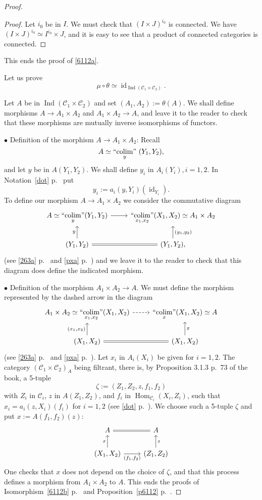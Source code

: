\documentclass[12pt]{article}
\theoremstyle{remark}
\theoremstyle{definition}
\newcommand{\bu}{\bullet}
\newcommand{\nn}{\noindent}
\newcommand{\C}{\mathcal C}
\DeclareMathOperator*{\colim}{colim}
\DeclareMathOperator*{\ic}{``\!\colim\!"}
\DeclareMathOperator{\id}{id}
\DeclareMathOperator{\Hom}{Hom}
\DeclareMathOperator{\Ind}{Ind}
\begin{document}
\begin{proof}
\begin{proof}
Let $i_0$ be in $I$. We must check that $(I\times J)^{i_0}$ is connected. We have $(I\times J)^{i_0}\simeq I^{i_0}\times J$, and it is easy to see that a product of connected categories is connected. 
\end{proof}

This ends the proof of \eqref{6112a}.

Let us prove
\begin{equation}\label{6112b}
\mu\circ\theta\simeq\id_{\Ind(\C_1\times\C_2)}.
\end{equation}

Let $A$ be in $\Ind(\C_1\times\C_2)$ and set $(A_1,A_2):=\theta(A)$. We shall define morphisms $A\to A_1\times A_2$ and $A_1\times A_2\to A$, and leave it to the reader to check that these morphisms are mutually inverse isomorphisms of functors. 

\nn$\bu$ Definition of the morphism $A\to A_1\times A_2$: Recall 
$$
A\simeq\ic_y\ (Y_1,Y_2), 
$$ 
and let $y$ be in $A(Y_1,Y_2)$. We shall define $y_i$ in $A_i(Y_i),i=1,2$. In Notation~\eqref{dot} p.~\pageref{dot} put 
$$
y_i:=a_i(y,Y_i)(\id_{Y_i}). 
$$ 
To define our morphism $A\to A_1\times A_2$ we consider the commutative diagram
$$
\begin{tikzcd}
A\simeq\ds\ic_y(Y_1,Y_2)\ar{r}&\ds\ic_{x_1,x_2}(X_1,X_2)\simeq A_1\times A_2\\ 
(Y_1,Y_2)\ar{u}{y}\ar[equal]{r}&(Y_1,Y_2),\ar{u}[swap]{(y_1,y_2)}
\end{tikzcd}
$$ 
(see \eqref{263a} p.~\pageref{263a} and \eqref{pxa} p.~\pageref{pxa}) and we leave it to the reader to check that this diagram does define the indicated morphism.

\nn$\bu$ Definition of the morphism $A_1\times A_2\to A$. We must define the morphism represented by the dashed arrow in the diagram  
$$
\begin{tikzcd}
A_1\times A_2\simeq\ds\ic_{x_1,x_2}(X_1,X_2)\ar[dashed]{r}&\ds\ic_x(X_1,X_2)\simeq A\\ 
(X_1,X_2)\ar{u}{(x_1,x_2)}\ar[equal]{r}&(X_1,X_2)\ar{u}[swap]{x}
\end{tikzcd}
$$ 
(see \eqref{263a} p.~\pageref{263a} and \eqref{pxa} p.~\pageref{pxa}). Let $x_i$ in $A_i(X_i)$ be given for $i=1,2$. The category $(\C_1\times\C_2)_A$ being filtrant, there is, by Proposition 3.1.3 p.~73 of the book, a 5-tuple 
$$
\zeta:=(Z_1,Z_2,z,f_1,f_2)
$$ 
with $Z_i$ in $\C_i$, $z$ in $A(Z_1,Z_2)$, and $f_i$ in $\Hom_{\C_i}(X_i,Z_i)$, such that $x_i=a_i(z,X_i)(f_i)$ for $i=1,2$ (see \eqref{dot} p.~\pageref{dot}). We choose such a 5-tuple $\zeta$ and put $x:=A(f_1,f_2)(z)$: 
$$
\begin{tikzcd}
A\ar[equal]{r}&A\\ 
(X_1,X_2)\ar{u}{x}\ar{r}[swap]{(f_1,f_2)}&(Z_1,Z_2)\ar{u}[swap]{z}
\end{tikzcd}
$$ 
One checks that $x$ does not depend on the choice of $\zeta$, and that this process defines a morphism from $A_1\times A_2$ to $A$. This ends the proofs of Isomorphism~\eqref{6112b} p.~\pageref{6112b} and Proposition~\ref{p6112} p.~\pageref{p6112}. 
\end{proof} 
\end{document}
